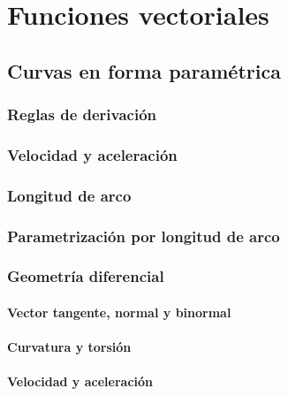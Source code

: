 \documentclass[12pt, fleqn]{report}                             %
\theoremstyle{break}                                            %
\begin{document}
    \chapter{Funciones vectoriales}
    
        \section{Curvas en forma paramétrica}
        
            \subsection{Reglas de derivación}
            
            \subsection{Velocidad y aceleración}
        
            \subsection{Longitud de arco}
            
            \subsection{Parametrización por longitud de arco}
            
            \subsection{Geometría diferencial}
                
                \subsubsection{Vector tangente, normal y binormal}
                
                \subsubsection{Curvatura y torsión}
                
                \subsubsection{Velocidad y aceleración}
                
\end{document}
